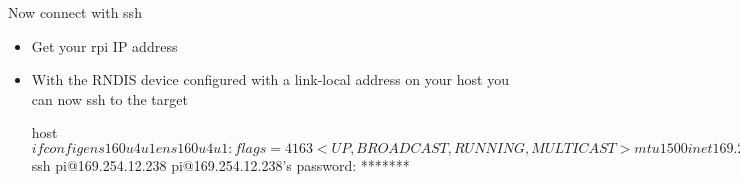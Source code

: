 \begin{frame}
   {Now connect with ssh}

   \begin{itemize}
      \item Get your rpi IP address
      \item With the RNDIS device configured with a link-local address on your host
	      you can now ssh to the target
      \begin{raw}
host$ ifconfig ens160u4u1
ens160u4u1: flags=4163<UP,BROADCAST,RUNNING,MULTICAST>  mtu 1500
inet 169.254.42.138  netmask 255.255.0.0  broadcast 169.254.255.255
host$ ssh pi@169.254.12.238
pi@169.254.12.238's password: *******
      \end{raw}

   \end{itemize}
\end{frame}

\cprotect\note{


}

